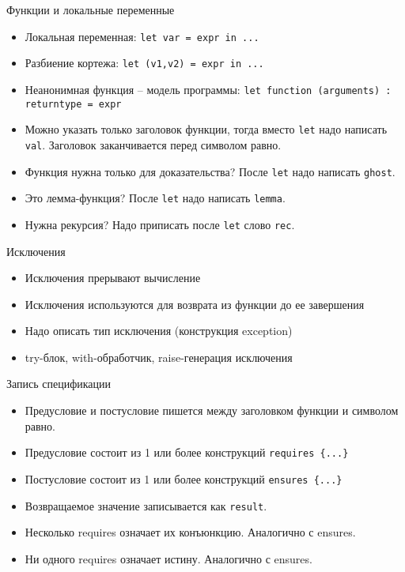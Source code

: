\documentclass[hyperref={unicode=true}]{beamer}
\begin{document}
    \begin{frame}{Функции и локальные переменные}
    \begin{itemize}
    \item
    Локальная переменная: \texttt{let var = expr in ... }
    \item
    Разбиение кортежа: \texttt{let (v1,v2) = expr in ... }
    \item
    Неанонимная функция -- модель программы:
    \texttt{let function (arguments) : returntype = expr}
    \item
    Можно указать только заголовок функции, тогда вместо \texttt{let}
    надо написать \texttt{val}. Заголовок заканчивается перед
    символом равно.
    \item
    Функция нужна только для доказательства? После \texttt{let}
    надо написать \texttt{ghost}.
    \item
    Это лемма-функция? После \texttt{let}
    надо написать \texttt{lemma}.
    \item
    Нужна рекурсия? Надо приписать после \texttt{let}
    слово \texttt{rec}.
    \end{itemize}
    \end{frame}

    \begin{frame}{Исключения}
    \begin{itemize}
    \item
    Исключения прерывают вычисление
    \item
    Исключения используются для возврата из функции до ее завершения
    \item
    Надо описать тип исключения (конструкция exception)
    \item
    try-блок, with-обработчик, raise-генерация исключения
    \end{itemize}
    \end{frame}

    \begin{frame}{Запись спецификации}
    \begin{itemize}
    \item
    Предусловие и постусловие пишется
    между заголовком функции и символом равно.
    \item
    Предусловие состоит из 1 или более
    конструкций \texttt{requires \{...\} }
    \item
    Постусловие состоит из 1 или более
    конструкций \texttt{ensures \{...\} }
    \item
    Возвращаемое значение записывается как \texttt{result}.
    \item
    Несколько requires означает их конъюнкцию. Аналогично с ensures.
    \item
    Ни одного requires означает истину. Аналогично с ensures.
    \end{itemize}
    \end{frame}
\end{document}
